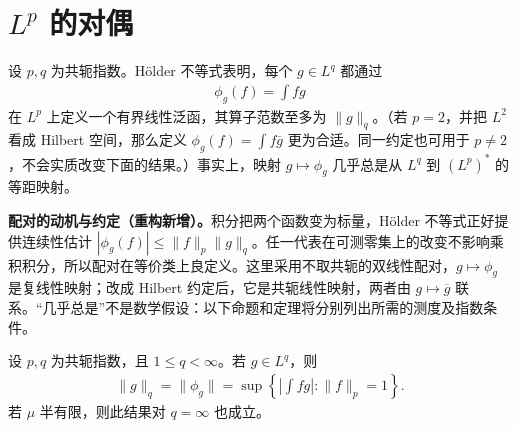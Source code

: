 \documentclass[../../main.tex]{subfiles}
\begin{document}
\section{$L^p$ 的对偶}\label{section:ch06-lp-dual}
设 $p,q$ 为共轭指数。Hölder 不等式表明，每个 $g\in L^q$ 都通过
\begin{align*}
\phi_g(f)=\int fg
\end{align*}
在 $L^p$ 上定义一个有界线性泛函，其算子范数至多为 $\|g\|_q$。（若 $p=2$，并把 $L^2$ 看成 Hilbert 空间，那么定义 $\phi_g(f)=\int f\overline g$ 更为合适。同一约定也可用于 $p\ne2$，不会实质改变下面的结果。）事实上，映射 $g\mapsto\phi_g$ 几乎总是从 $L^q$ 到 $(L^p)^*$ 的等距映射。
\begin{remark}
\textbf{配对的动机与约定（重构新增）。}积分把两个函数变为标量，Hölder 不等式正好提供连续性估计 $|\phi_g(f)|\leqslant\|f\|_p\|g\|_q$。任一代表在可测零集上的改变不影响乘积积分，所以配对在等价类上良定义。这里采用不取共轭的双线性配对，$g\mapsto\phi_g$ 是复线性映射；改成 Hilbert 约定后，它是共轭线性映射，两者由 $g\mapsto\overline g$ 联系。“几乎总是”不是数学假设：以下命题和定理将分别列出所需的测度及指数条件。
\end{remark}
\begin{proposition}\label{proposition:ch06-dual-pairing-isometry}
设 $p,q$ 为共轭指数，且 $1\leqslant q<\infty$。若 $g\in L^q$，则
\begin{align*}
\|g\|_q=\|\phi_g\|=\sup\left\{\left|\int fg\right|:\|f\|_p=1\right\}.
\end{align*}
若 $\mu$ 半有限，则此结果对 $q=\infty$ 也成立。
\end{proposition}
\end{document}
